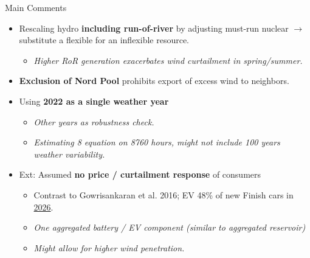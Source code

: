 \documentclass[10pt, aspectratio=169]{beamer}
\begin{document}
\begin{frame}{Main Comments}
\begin{itemize}
    \item Rescaling hydro \textbf{including run-of-river} by adjusting must-run nuclear $\rightarrow$ substitute a flexible for an inflexible resource. 
    \begin{itemize}
        \item \textit{Higher RoR generation exacerbates wind curtailment in spring/summer. }
    \end{itemize}
    \item \textbf{Exclusion of Nord Pool} prohibits export of excess wind to neighbors. 
    \item Using \textbf{2022 as a single weather year}
    \begin{itemize}
        \item \textit{Other years as robustness check.}
        \item \textit{Estimating 8 equation on 8760 hours, might not include 100 years weather variability.} 
    \end{itemize}
    \vspace{0.0cm}
    \item Ext: Assumed \textbf{no price / curtailment response} of consumers 
    \begin{itemize}
        \item Contrast to Gowrisankaran et al. 2016; EV 48\% of new Finish cars in \href{https://theicct.org/publication/european-car-market-monitor-may-2026/}{2026}.
        \item \textit{One aggregated battery / EV component (similar to aggregated reservoir)}
        \item \textit{Might allow for higher wind penetration.}
    \end{itemize}
    

\end{itemize}
\end{frame}
\end{document}
